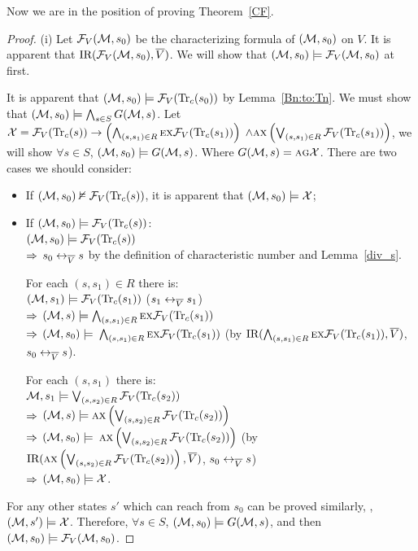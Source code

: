 \documentclass{article}
\begin{document}
Now we are in the position of proving Theorem~\ref{CF}.\\
\begin{proof}
(i) Let ${\cal F}_V({\cal M}, s_0)$ be the characterizing formula of $({\cal M}, s_0)$ on $V$.
It is apparent that $\textrm{IR}({\cal F}_V({\cal M}, s_0), \overline V)$. We will show that $({\cal M}, s_0) \models {\cal F}_V({\cal M}, s_0)$ at first.

It is apparent that $({\cal M}, s_0) \models {\cal F}_V(\textrm{Tr}_c(s_0))$ by Lemma~\ref{Bn:to:Tn}.
We must show that $({\cal M}, s_0) \models \bigwedge_{s\in S} G({\cal M}, s)$.
Let ${\cal X} = {\cal F}_V(\textrm{Tr}_c(s)) \rightarrow \left(\bigwedge_{(s,s_1) \in R} \textsc{e} \textsc{x} {\cal F}_V(\textrm{Tr}_c(s_1))\right)$ $\wedge \textsc{a} \textsc{x} \left(\bigvee_{(s,s_1) \in R} {\cal F}_V(\textrm{Tr}_c(s_1))\right)$, we will show $\forall s\in S$, $({\cal M}, s_0) \models G({\cal M}, s)$. Where $G({\cal M}, s)=\textsc{a}\textsc{g} \cal X$.
There are two cases we should consider:
\begin{itemize}
  \item  If $({\cal M}, s_0) \nvDash {\cal F}_V(\textrm{Tr}_c(s))$, it is apparent that $({\cal M}, s_0) \models {\cal X}$;
  \item  If $({\cal M}, s_0) \models {\cal F}_V(\textrm{Tr}_c(s))$:\\
         $({\cal M}, s_0) \models {\cal F}_V(\textrm{Tr}_c(s))$\\
        $\Rightarrow$  $s_0 \leftrightarrow_{\overline V} s$ by the definition of characteristic number and Lemma~\ref{div_s}.

        For each $(s, s_1)\in R$ there is:\\
         $({\cal M}, s_1) \models {\cal F}_V(\textrm{Tr}_c(s_1))$  \hfill  ($s_1 \leftrightarrow_{\overline V} s_1$)\\
        $\Rightarrow$ $({\cal M}, s) \models \bigwedge_{(s,s_1)\in R}\textsc{e} \textsc{x} {\cal F}_V(\textrm{Tr}_c(s_1))$\\
        $\Rightarrow$ $({\cal M}, s_0) \models$ $\bigwedge_{(s,s_1)\in R}\textsc{e} \textsc{x} {\cal F}_V(\textrm{Tr}_c(s_1))$    \qquad  (by $\textrm{IR}(\bigwedge_{(s,s_1)\in R}\textsc{e} \textsc{x} {\cal F}_V(\textrm{Tr}_c(s_1)), \overline V)$, $s_0 \leftrightarrow_{\overline V} s$).

         For each $(s, s_1)$ there is:\\
          ${\cal M}, s_1 \models \bigvee_{(s, s_2)\in R}{\cal F}_V(\textrm{Tr}_c(s_2))$\\
        $\Rightarrow$ $({\cal M}, s) \models \textsc{a} \textsc{x} \left( \bigvee_{(s, s_2)\in R} {\cal F}_V(\textrm{Tr}_c(s_2)) \right)$ \\
        $\Rightarrow$ $({\cal M}, s_0) \models$  $\textsc{a} \textsc{x} \left( \bigvee_{(s, s_2)\in R} {\cal F}_V(\textrm{Tr}_c(s_2)) \right)$   \qquad  (by $\textrm{IR}(\textsc{a} \textsc{x} \left( \bigvee_{(s, s_2)\in R} {\cal F}_V(\textrm{Tr}_c(s_2)) \right), \overline V)$, $s_0 \leftrightarrow_{\overline V} s$)\\
        $\Rightarrow$ $({\cal M}, s_0) \models {\cal X}$.\\
\end{itemize}
For any other states $s'$ which can reach from $s_0$ can be proved similarly, \ie, $({\cal M},s')\models \cal X$.
Therefore, $\forall s\in S$, $({\cal M}, s_0) \models G({\cal M}, s)$, and then $({\cal M}, s_0) \models {\cal F}_V({\cal M}, s_0)$.



\end{proof}
\end{document}
